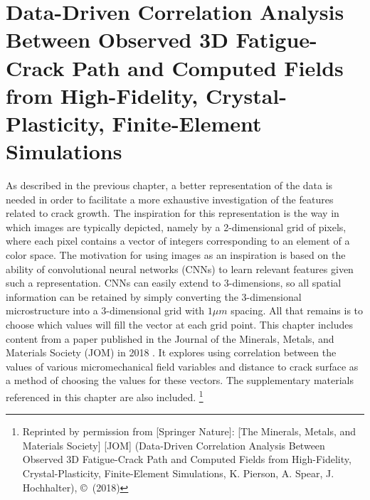 
\chapter{Data-Driven Correlation Analysis Between Observed 3D Fatigue\allowbreak-Crack Path and Computed Fields from High-Fidelity, Crystal\allowbreak-Plasticity, Finite-Element Simulations}

As described in the previous chapter, a better representation of the data is needed in order to facilitate a more exhaustive investigation of the features related to crack growth.  The inspiration for this representation is the way in which images are typically depicted, namely by a 2-dimensional grid of pixels, where each pixel contains a vector of integers corresponding to an element of a color space.  The motivation for using images as an inspiration is based on the ability of convolutional neural networks (CNNs) to learn relevant features given such a representation.  CNNs can easily extend to 3-dimensions, so all spatial information can be retained by simply converting the 3-dimensional microstructure into a 3-dimensional grid with $1 \mu m$ spacing.  All that remains is to choose which values will fill the vector at each grid point.  This chapter includes content from a paper published in the Journal of the Minerals, Metals, and Materials Society (JOM) in 2018 \cite{pierson2018}.  It explores using correlation between the values of various micromechanical field variables and distance to crack surface as a method of choosing the values for these vectors.  The supplementary materials referenced in this chapter are also included. \footnote{Reprinted by permission from [Springer Nature]: [The Minerals, Metals, and Materials Society] [JOM] \cite{pierson2018} (Data-Driven Correlation Analysis Between Observed 3D Fatigue-Crack Path and Computed Fields from High-Fidelity, Crystal-Plasticity, Finite-Element Simulations, K. Pierson, A. Spear, J. Hochhalter), \copyright\ (2018)}




